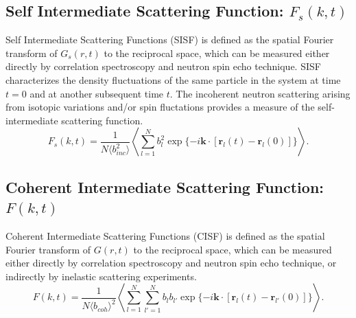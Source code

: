 \documentclass{article}
\begin{document}
\subsection{Self Intermediate Scattering Function: $F_s(k,t)$} \label{sec::Fsqt}
Self Intermediate Scattering Functions (SISF) is defined as the spatial Fourier transform of $G_s(r,t)$ to the reciprocal space, which can be measured either directly by correlation spectroscopy and neutron spin echo technique. SISF characterizes the density fluctuations of the same particle in the system at time $t = 0$ and at another subsequent time $t$. The incoherent neutron scattering arising from isotopic variations and/or spin fluctations provides a measure of the self-intermediate scattering function.
\begin{equation}
\label{eq:fsqt}
F_s(k,t) = \frac{1}{N\langle b_{inc}^2\rangle} \left\langle \sum_{l=1}^{N} b_l^2\exp{\{-i\mathbf{k}\cdot[\mathbf{r}_l(t) - \mathbf{r}_l(0)]}\}\right\rangle.
\end{equation}

\subsection{Coherent Intermediate Scattering Function: $F(k,t)$} \label{sec::Fqt}
Coherent Intermediate Scattering Functions (CISF) is defined as the spatial Fourier transform of $G(r,t)$ to the reciprocal space, which can be measured either directly by correlation spectroscopy and neutron spin echo technique, or indirectly by inelastic scattering experiments. 
\begin{equation}
\label{eq:fqt}
F(k,t) = \frac{1}{N\langle b_{coh}\rangle^2} \left\langle \sum_{l=1}^{N}\sum_{l'=1}^{N} b_lb_{l'}\exp{\{-i\mathbf{k}\cdot[\mathbf{r}_l(t) - \mathbf{r}_{l'}(0)]}\}\right\rangle.
\end{equation}  
\end{document}
